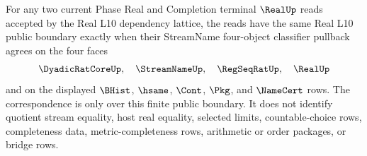 \begin{theorem}
\label{thm:real-l10-streamname-classifier-pullback-correspondence}
For any two current Phase Real and Completion terminal $\RealUp$ reads accepted by the Real L10 dependency lattice, the reads have the same Real L10 public boundary exactly when their StreamName four-object classifier pullback agrees on the four faces
$$
\DyadicRatCoreUp,\quad \StreamNameUp,\quad \RegSeqRatUp,\quad \RealUp
$$
and on the displayed $\BHist$, $\hsame$, $\Cont$, $\Pkg$, and $\NameCert$ rows. The correspondence is only over this finite public boundary. It does not identify quotient stream equality, host real equality, selected limits, countable-choice rows, completeness data, metric-completeness rows, arithmetic or order packages, or bridge rows.
\end{theorem}
